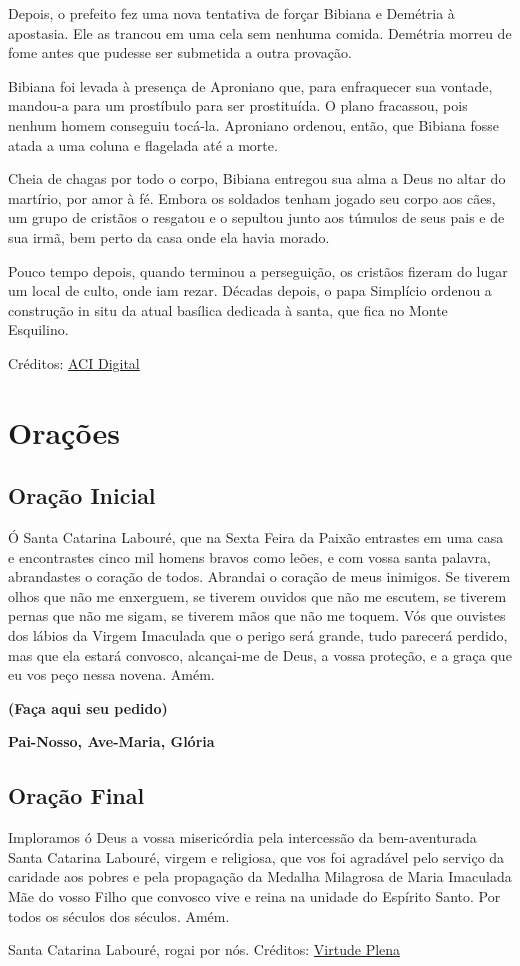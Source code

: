 \documentclass[11pt]{article}
\begin{document}
\begin{justify}
Depois, o prefeito fez uma nova tentativa de forçar Bibiana e Demétria à apostasia. Ele as trancou em uma cela sem nenhuma comida. Demétria morreu de fome antes que pudesse ser submetida a outra provação.

Bibiana foi levada à presença de Aproniano que, para enfraquecer sua vontade, mandou-a para um prostíbulo para ser prostituída. O plano fracassou, pois nenhum homem conseguiu tocá-la. Aproniano ordenou, então, que Bibiana fosse atada a uma coluna e flagelada até a morte.  

Cheia de chagas por todo o corpo, Bibiana entregou sua alma a Deus no altar do martírio, por amor à fé. Embora os soldados tenham jogado seu corpo aos cães, um grupo de cristãos o resgatou e o sepultou junto aos túmulos de seus pais e de sua irmã, bem perto da casa onde ela havia morado.

Pouco tempo depois, quando terminou a perseguição, os cristãos fizeram do lugar um local de culto, onde iam rezar. Décadas depois, o papa Simplício ordenou a construção in situ da atual basílica dedicada à santa, que fica no Monte Esquilino.

\end{justify}
Créditos: \href{https://www.acidigital.com/noticia/53880/hoje-e-celebrada-santa-bibiana-padroeira-dos-que-sofrem-de-epilepsia-e-dores-fortes}{ACI Digital}
\section{Orações}
\subsection{Oração Inicial}

Ó Santa Catarina Labouré, que na Sexta Feira da Paixão entrastes em uma casa e encontrastes cinco mil homens bravos como leões, e com vossa santa palavra, abrandastes o coração de todos. Abrandai o coração de meus inimigos. Se tiverem olhos que não me enxerguem, se tiverem ouvidos que não me escutem, se tiverem pernas que não me sigam, se tiverem mãos que não me toquem. Vós que ouvistes dos lábios da Virgem Imaculada que o perigo será grande, tudo parecerá perdido, mas que ela estará convosco, alcançai-me de Deus, a vossa proteção, e a graça que eu vos peço nessa novena. Amém.

\textbf{(Faça aqui seu pedido)}

\textbf{Pai-Nosso, Ave-Maria, Glória}

\subsection{Oração Final} Imploramos ó Deus a vossa misericórdia pela intercessão da bem-aventurada Santa Catarina Labouré, virgem e religiosa, que vos foi agradável pelo serviço da caridade aos pobres e pela propagação da Medalha Milagrosa de Maria Imaculada Mãe do vosso Filho que convosco vive e reina na unidade do Espírito Santo. Por todos os séculos dos séculos. Amém.

Santa Catarina Labouré, rogai por nós.
\vfill 
Créditos: \href{https://www.youtube.com/watch?v=iuhbMUT5Jsg&list=PLRL6i6PPLb5_yVJcbDOcvhqSL82u_xFHj}{Virtude Plena}
\end{document}
